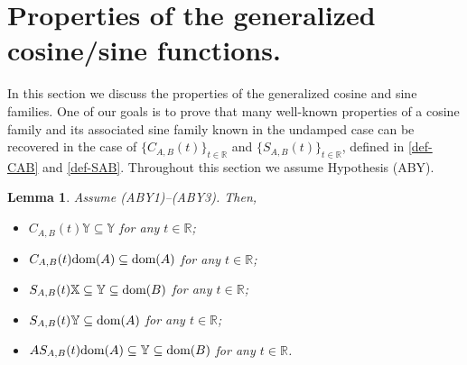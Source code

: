 \documentclass[11pt]{amsart}
\numberwithin{equation}{section}
\newcommand{\SAB}{S_{A,B}}
\newcommand{\CAB}{C_{A,B}}
\newcommand{\RR}{{\mathbb R}}
\newtheorem{lemma}[theorem]{Lemma}
\theoremstyle{remark}
\theoremstyle{definition}
\newcommand\bX{{\mathbb X}}
\newcommand\bY{{\mathbb Y}}
\newcommand{\dom}{\text{\rm{dom}}}
\begin{document}
\section{Properties of the generalized cosine/sine functions.}\label{s4}
In this section we discuss the properties of the generalized cosine and sine families. One of our goals is to prove that many well-known properties of a cosine family and its associated sine family known in the undamped case can be recovered in the case of 
$\{\CAB(t)\}_{t\in\RR}$ and $\{\SAB(t)\}_{t\in\RR}$, defined in \eqref{def-CAB} and \eqref{def-SAB}. Throughout this section we assume Hypothesis (ABY). 
\begin{lemma}\label{l4.1}
	Assume \textnormal{(ABY1)--(ABY3)}. Then, 
	\begin{itemize}
		\item[(i)] $\CAB(t)\bY \subseteq \bY$ for any $t \in \mathbb{R}$;
		\item[(ii)] $\CAB(t)\dom(A) \subseteq \dom(A)$ for any $t \in \mathbb{R}$;
		\item[(iii)] $\SAB(t)\bX \subseteq \bY \subseteq \dom(B)$ for any $t \in \mathbb{R}$;
		\item[(iv)] $\SAB(t)\bY\subseteq\dom(A)$ for any $t \in \mathbb{R}$;
		\item[(v)] $A\SAB(t)\dom(A) \subseteq\bY \subseteq \dom(B)$ for any $t \in \mathbb{R}$.
	\end{itemize}
\end{lemma}
\end{document}

